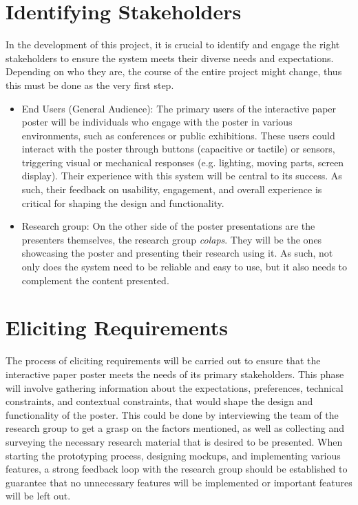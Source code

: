 \section{Identifying Stakeholders}
In the development of this project, it is crucial to identify and engage the right stakeholders to ensure the system meets their diverse needs and expectations. Depending on who they are, the course of the entire project might change, thus this must be done as the very first step.
\begin{itemize}
	\item End Users (General Audience): The primary users of the interactive paper poster will be individuals who engage with the poster in various environments, such as conferences or public exhibitions. These users could interact with the poster through buttons (capacitive or tactile) or sensors, triggering visual or mechanical responses (e.g. lighting, moving parts, screen display). Their experience with this system will be central to its success. As such, their feedback on usability, engagement, and overall experience is critical for shaping the design and functionality.
	\item  Research group: On the other side of the poster presentations are the presenters themselves, the research group \emph{colaps}. They will be the ones showcasing the poster and presenting their research using it. As such, not only does the system need to be reliable and easy to use, but it also needs to complement the content presented.
\end{itemize}

\section{Eliciting Requirements}
The process of eliciting requirements will be carried out to ensure that the interactive paper poster meets the needs of its primary stakeholders. This phase will involve gathering information about the expectations, preferences, technical constraints, and contextual constraints, that would shape the design and functionality of the poster.
This could be done by interviewing the team of the research group to get a grasp on the factors mentioned, as well as collecting and surveying the necessary research material that is desired to be presented.
When starting the prototyping process, designing mockups, and implementing various features, a strong feedback loop with the research group should be established to guarantee that no unnecessary features will be implemented or important features will be left out.


